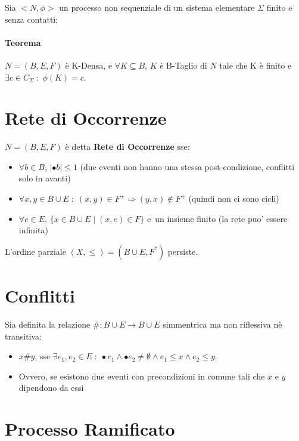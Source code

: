 Sia $<N , \phi>$ un processo non sequenziale di un sistema elementare $\Sigma$ finito e senza contatti;

\paragraph{Teorema}

$N = (B, E, F)$ \`e K-Densa, e $\forall K \subseteq B$, $K$ \`e B-Taglio di $N$ tale che K \`e finito e $\exists c \in C_\Sigma \; : \; \phi(K) = c$.

\section{Rete di Occorrenze}

$N = (B, E, F)$ \`e detta \textbf{Rete di Occorrenze} sse:

\begin{itemize}
    \item $\forall b \in B$, $|\bullet b| \leq 1$ (due eventi non hanno una stessa post-condizione, conflitti solo in avanti)
    \item $\forall x,y \in B \cup E \; : \; (x, y) \in F^+ \Rightarrow (y, x) \notin F^+$ (quindi non ci sono cicli)
    \item $\forall e \in E$, $\{ x \in B \cup E \; | \; (x, e) \in F \}$ e\ un insieme finito (la rete puo' essere infinita)
\end{itemize}

L'ordine parziale $(X, \leq) = (B \cup E, F^*)$ persiste.

\section{Conflitti}

Sia definita la relazione $\# : B \cup E \rightarrow B \cup E$ simmentrica ma non riflessiva n\`e transitiva:

\begin{itemize}
    \item $x \# y$, sse $\exists e_1,e_2 \in E \; : \; \bullet e_1 \land \bullet e_2 \neq \emptyset \land e_1 \leq x \land e_2 \leq y$.
    \item Ovvero, se esistono due eventi con precondizioni in comune tali che $x$ e $y$ dipendono da essi
\end{itemize}

\section{Processo Ramificato}

